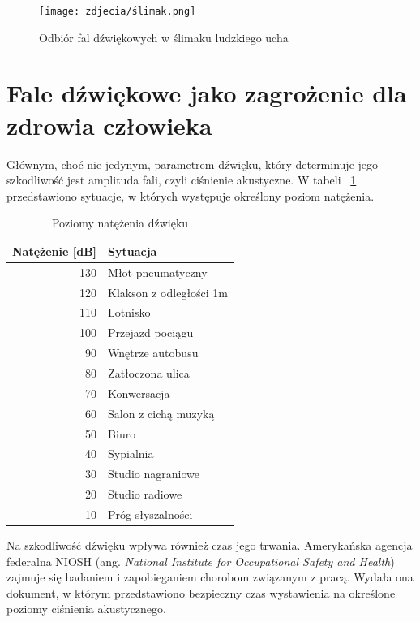 \begin{figure}[H]
	\centering
	\texttt{[image: zdjecia/ślimak.png]}
	\caption{\label{ślimak} Odbiór fal dźwiękowych w ślimaku ludzkiego ucha}
\end{figure}


\section{Fale dźwiękowe jako zagrożenie dla zdrowia człowieka}

Głównym, choć nie jedynym, parametrem dźwięku, który determinuje jego szkodliwość jest amplituda fali, czyli ciśnienie akustyczne. W tabeli ~\ref{tab:SPL} przedstawiono sytuacje, w których występuje określony poziom natężenia.

\begin{table}[H]
	\centering
	\begin{tabular}{|r|l|}
		\hline
		Natężenie [dB] & Sytuacja \\
		\hline
		\hline
		\rowcolor{red!50}
		130 & Młot pneumatyczny \\
		\hline
		\rowcolor{red!40}
		120 & Klakson z odległości 1m \\
		\hline
		\rowcolor{red!30}
		110 & Lotnisko \\
		\hline
		\rowcolor{red!20}
		100 & Przejazd pociągu \\
		\hline
		\rowcolor{orange!20}
		90 & Wnętrze autobusu \\
		\hline
		\rowcolor{yellow!20}
		80 & Zatłoczona ulica \\
		\hline
		\rowcolor{green!30}
		70 & Konwersacja \\
		\hline
		\rowcolor{green!30}
		60 & Salon z cichą muzyką \\
		\hline
		\rowcolor{green!30}
		50 & Biuro \\
		\hline
		\rowcolor{green!30}
		40 & Sypialnia \\
		\hline
		\rowcolor{green!30}
		30 & Studio nagraniowe \\
		\hline
		\rowcolor{green!30}
		20 & Studio radiowe \\
		\hline
		\rowcolor{green!30}
		10 & Próg słyszalności \\
		\hline
	\end{tabular}
	\caption{Poziomy natężenia dźwięku\cite{SPLtable}}
	\label{tab:SPL}
\end{table}

Na szkodliwość dźwięku wpływa również czas jego trwania. Amerykańska agencja federalna NIOSH (ang. \textit{National Institute for Occupational Safety and Health}) zajmuje się badaniem i zapobieganiem chorobom związanym z pracą. Wydała ona dokument\cite{NIOSH}, w którym przedstawiono bezpieczny czas wystawienia na określone poziomy ciśnienia akustycznego.

